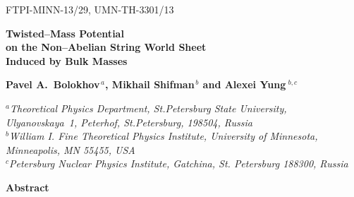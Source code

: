 \documentclass[12pt]{article}
\begin{document}
\begin{titlepage}


\begin{flushright}
FTPI-MINN-13/29, UMN-TH-3301/13\\
\end{flushright}


\vspace{1.6cm}
\begin{center}
{\Large \bf  Twisted--Mass Potential \\
	on the Non--Abelian String World Sheet \\[2.4mm]
             Induced by Bulk Masses}
\end{center}



\vspace{2mm}

\begin{center}

 {\large
 \bf   Pavel A.~Bolokhov$^{\,a}$,  Mikhail Shifman$^{\,b}$ and \bf Alexei Yung$^{\,\,b,c}$}
\end {center}

\begin{center}

$^a${\it Theoretical Physics Department, St.Petersburg State University, Ulyanovskaya~1, 
	 Peterhof, St.Petersburg, 198504, Russia}\\
$^b${\it  William I. Fine Theoretical Physics Institute,
University of Minnesota,
Minneapolis, MN 55455, USA}\\
$^c${\it Petersburg Nuclear Physics Institute, Gatchina, St. Petersburg
188300, Russia
}
\end{center}



\vspace{1cm}
\begin{center}
{\large\bf Abstract}
\end{center}


\end{titlepage}
\end{document}
